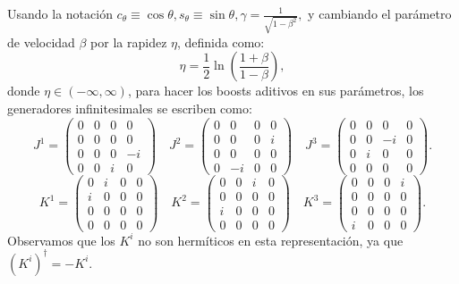 \documentclass[a4paper,11pt]{book} %
\begin{document}
Usando la notación $c_\theta \equiv \cos\theta, s_\theta \equiv \sin\theta, \gamma = \frac{1}{\sqrt{1-\beta^2}},$ y cambiando el parámetro de velocidad \(\beta\) por la rapidez \(\eta\), definida como:
\begin{equation}
\eta = \frac{1}{2}\ln\left(\frac{1+\beta}{1-\beta}\right),
\end{equation}
donde \(\eta\in(-\infty,\infty)\), para hacer los boosts aditivos en sus parámetros, los generadores infinitesimales se escriben como:
\begin{equation}
J^1 =
\begin{pmatrix}
0 & 0 & 0 & 0 \\
0 & 0 & 0 & 0 \\
0 & 0 & 0 & -i \\
0 & 0 & i & 0
\end{pmatrix}
\quad
J^2 =
\begin{pmatrix}
0 & 0 & 0 & 0 \\
0 & 0 & 0 & i \\
0 & 0 & 0 & 0 \\
0 & -i & 0 & 0
\end{pmatrix}
\quad
J^3 =
\begin{pmatrix}
0 & 0 & 0 & 0 \\
0 & 0 & -i & 0 \\
0 & i & 0 & 0 \\
0 & 0 & 0 & 0
\end{pmatrix}.
\end{equation}
\begin{equation}
K^1 =
\begin{pmatrix}
0 & i & 0 & 0 \\
i & 0 & 0 & 0 \\
0 & 0 & 0 & 0 \\
0 & 0 & 0 & 0
\end{pmatrix}
\quad
K^2 =
\begin{pmatrix}
0 & 0 & i & 0 \\
0 & 0 & 0 & 0 \\
i & 0 & 0 & 0 \\
0 & 0 & 0 & 0
\end{pmatrix}
\quad
K^3 =
\begin{pmatrix}
0 & 0 & 0 & i \\
0 & 0 & 0 & 0 \\
0 & 0 & 0 & 0 \\
i & 0 & 0 & 0
\end{pmatrix}.
\end{equation}
\newpage\noindent
Observamos que los \(K^i\) no son hermíticos en esta representación, ya que $(K^i)^\dagger = -K^i.$
\end{document}

